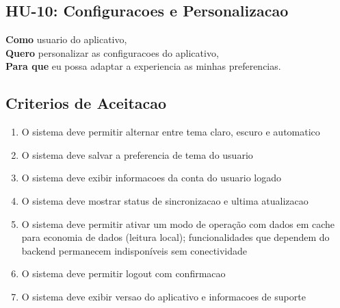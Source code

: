 \begin{apendicesenv}

\section{HU-10: Configuracoes e Personalizacao}
\label{hu:configuracoes}

\textbf{Como} usuario do aplicativo, \\
\textbf{Quero} personalizar as configuracoes do aplicativo, \\
\textbf{Para que} eu possa adaptar a experiencia as minhas preferencias.

\subsection*{Criterios de Aceitacao}

\begin{enumerate}
    \item O sistema deve permitir alternar entre tema claro, escuro e automatico
    \item O sistema deve salvar a preferencia de tema do usuario
    \item O sistema deve exibir informacoes da conta do usuario logado
    \item O sistema deve mostrar status de sincronizacao e ultima atualizacao
    \item O sistema deve permitir ativar um modo de operação com dados em cache para economia de dados (leitura local); funcionalidades que dependem do backend permanecem indisponíveis sem conectividade
    \item O sistema deve permitir logout com confirmacao
    \item O sistema deve exibir versao do aplicativo e informacoes de suporte
\end{enumerate}


\end{apendicesenv}
